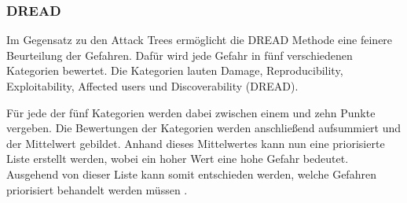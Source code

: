 \subsubsection{DREAD}
Im Gegensatz zu den Attack Trees ermöglicht die DREAD Methode eine feinere Beurteilung der Gefahren.
Dafür wird jede Gefahr in fünf verschiedenen Kategorien bewertet.
Die Kategorien lauten Damage, Reproducibility, Exploitability, Affected users und Discoverability (DREAD).

Für jede der fünf Kategorien werden dabei zwischen einem und zehn Punkte vergeben.
Die Bewertungen der Kategorien werden anschließend aufsummiert und der Mittelwert gebildet.
Anhand dieses Mittelwertes kann nun eine priorisierte Liste erstellt werden, wobei ein hoher Wert eine hohe Gefahr bedeutet.
Ausgehend von dieser Liste kann somit entschieden werden, welche Gefahren priorisiert behandelt werden müssen \autocite[vgl.][]{domars_threat_2023}.
